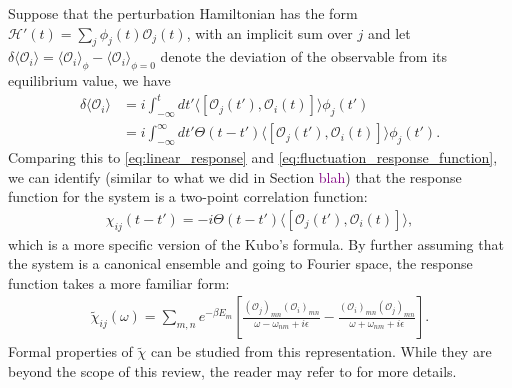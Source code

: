 \documentclass[reprint,
nofootinbib,
amsmath,amssymb,
aps]{revtex4-1}
\newcommand{\be}{\beta}
\newcommand{\f}[2]{\frac{#1}{#2}}
\newcommand{\lb}{\left[}
\newcommand{\rb}{\right]}
\begin{document}
Suppose that the perturbation Hamiltonian has the form $\mathcal{H}'(t) = \sum_j \phi_j (t) \mathcal{O}_j(t)$, with an implicit sum over $j$ and let $\delta \langle \mathcal{O}_i \rangle = \langle \mathcal{O}_i \rangle_\phi - \langle  \mathcal{O}_i \rangle_{\phi = 0}$ denote the deviation of the observable from its equilibrium value, we have
\begin{align*}
\delta \langle \mathcal{O}_i \rangle 
&=  i \int_{-\infty}^t dt' \langle  [ \mathcal{O}_j(t'), \mathcal{O}_i(t)   ] \rangle \phi_j(t') \\
&= i \int_{-\infty}^\infty dt' \Theta(t-t') \langle  [ \mathcal{O}_j(t'), \mathcal{O}_i(t)   ] \rangle \phi_j(t').
\end{align*} 
Comparing this to \eqref{eq:linear_response} and \eqref{eq:fluctuation_response_function}, we can identify (similar to what we did in Section \textcolor{purple}{blah}) that the response function for the system is a two-point correlation function:
\begin{align}\label{eq:corr_func}
\chi_{ij}(t-t') = -i \Theta(t-t') \langle  [ \mathcal{O}_j(t'), \mathcal{O}_i(t)   ] \rangle,
\end{align}
which is a more specific version of the Kubo's formula. By further assuming that the system is a canonical ensemble and going to Fourier space, the response function takes a more familiar form:
\begin{align*}
\widetilde{\chi}_{ij}(\omega) = \sum_{m,n} e^{-\be E_m} \lb 
\f{(\mathcal{O}_j)_{mn}(\mathcal{O}_i)_{mn}}{\omega - \omega_{nm} + i\epsilon} 
- 
\f{(\mathcal{O}_i)_{mn}(\mathcal{O}_j)_{mn}}{\omega + \omega_{nm} + i\epsilon} 
\rb.
\end{align*}
Formal properties of $\widetilde{\chi}$ can be studied from this representation. While they are beyond the scope of this review, the reader may refer to \cite{pitaevskii2016bose} for more details.  
\end{document}
